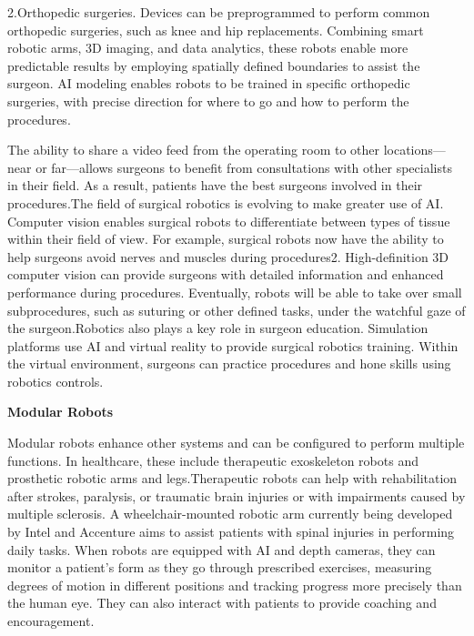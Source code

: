 \documentclass[12pt,a4paper]{report}
\begin{document}
2.Orthopedic surgeries. Devices can be preprogrammed to perform common orthopedic surgeries, such as knee and hip replacements. Combining smart robotic arms, 3D imaging, and data analytics, these robots enable more predictable results by employing spatially defined boundaries to assist the surgeon. AI modeling enables robots to be trained in specific orthopedic surgeries, with precise direction for where to go and how to perform the procedures.\par

The ability to share a video feed from the operating room to other locations—near or far—allows surgeons to benefit from consultations with other specialists in their field. As a result, patients have the best surgeons involved in their procedures.The field of surgical robotics is evolving to make greater use of AI. Computer vision enables surgical robots to differentiate between types of tissue within their field of view. For example, surgical robots now have the ability to help surgeons avoid nerves and muscles during procedures2. High-definition 3D computer vision can provide surgeons with detailed information and enhanced performance during procedures. Eventually, robots will be able to take over small subprocedures, such as suturing or other defined tasks, under the watchful gaze of the surgeon.Robotics also plays a key role in surgeon education. Simulation platforms use AI and virtual reality to provide surgical robotics training. Within the virtual environment, surgeons can practice procedures and hone skills using robotics controls.\par
\begin{center}
  \small{\textbf{Modular Robots}}
\end{center}
Modular robots enhance other systems and can be configured to perform multiple functions. In healthcare, these include therapeutic exoskeleton robots and prosthetic robotic arms and legs.Therapeutic robots can help with rehabilitation after strokes, paralysis, or traumatic brain injuries or with impairments caused by multiple sclerosis. A wheelchair-mounted robotic arm currently being developed by Intel and Accenture aims to assist patients with spinal injuries in performing daily tasks. When robots are equipped with AI and depth cameras, they can monitor a patient’s form as they go through prescribed exercises, measuring degrees of motion in different positions and tracking progress more precisely than the human eye. They can also interact with patients to provide coaching and encouragement.\par
\end{document}
